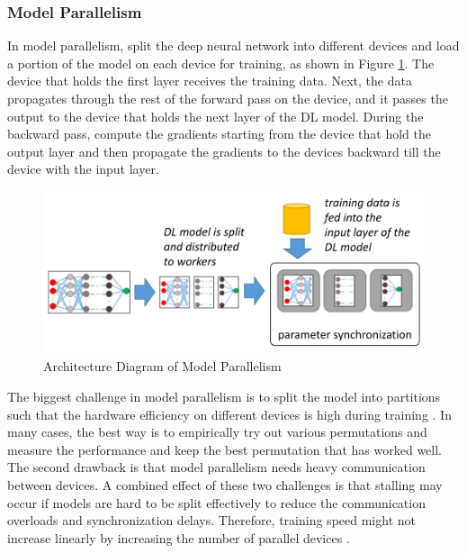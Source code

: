 \subsubsection{Model Parallelism}
In model parallelism, split the deep neural network into different devices and load a portion of the model on each device for training, as shown in Figure \ref{fig:modelparallel}. The device that holds the first layer receives the training data. Next, the data propagates through the rest of the forward pass on the device, and it passes the output to the device that holds the next layer of the DL model. During the backward pass, compute the gradients starting from the device that hold the output layer and then propagate the gradients to the devices backward till the device with the input layer. 

\begin{figure}[ht]
  \begin{center}
    \includegraphics[width=\textwidth]{images/model parallelism.png} 
    \caption{Architecture Diagram of Model Parallelism  \cite{Mayer2020ScalableInfrastructures}}
    \label{fig:modelparallel}
  \end{center}
\end{figure}

The biggest challenge in model parallelism is to split the model into partitions such that the hardware efficiency on different devices is high during training \cite{Mayer2017ThePath}. In many cases, the best way is to empirically try out various permutations and measure the performance and keep the best permutation that has worked well. The second drawback is that model parallelism needs heavy communication between devices. A combined effect of these two challenges is that stalling may occur if models are hard to be split effectively to reduce the communication overloads and synchronization delays. Therefore, training speed might not increase linearly by increasing the number of parallel devices \cite{Mirhoseini2017DeviceLearning}.

